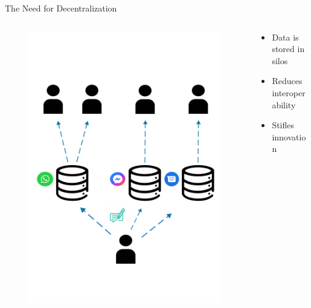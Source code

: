 \begin{frame}{The Need for Decentralization}


    \begin{columns}[T] %
        \begin{column}{.48\textwidth}

       \begin{figure}
            \centering
            \includegraphics[height = .7\textheight]{figures/bad_messages_enzo}
        \end{figure}

        \end{column}%
        \hfill%
        \begin{column}{.48\textwidth}
            \bigskip
            \begin{itemize}
                \item Data is stored in silos
                \item Reduces interoperability 
                \item Stifles innovation
            \end{itemize}
        \end{column}%
    \end{columns}
\end{frame}

